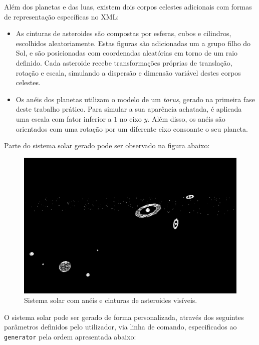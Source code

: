 \documentclass[12pt, a4paper]{article}
\begin{document}
Além dos planetas e das luas, existem dois corpos celestes adicionais com formas de representação
específicas no XML:

\begin{itemize}
    \item As cinturas de asteroides são compostas por esferas, cubos e cilindros, escolhidos
        aleatoriamente. Estas figuras são adicionadas um a grupo filho do Sol, e são posicionadas
        com coordenadas aleatórias em torno de um raio definido. Cada asteroide recebe
        transformações próprias de translação, rotação e escala, simulando a dispersão e dimensão
        variável destes corpos celestes.

    \item Os anéis dos planetas utilizam o modelo de um \emph{torus}, gerado na primeira fase deste
        trabalho prático. Para simular a sua aparência achatada, é aplicada uma escala com fator
        inferior a $1$ no eixo $y$. Além disso, os anéis são orientados com uma rotação por um
        diferente eixo consoante o seu planeta.
\end{itemize}

Parte do sistema solar gerado pode ser observado na figura abaixo:

\begin{figure}[H]
    \centering
    \includegraphics[width=0.9\linewidth]{res/phase2/results/SolarSystemOverview.png}
    \caption{Sistema solar com anéis e cinturas de asteroides visíveis.}
\end{figure}

O sistema solar pode ser gerado de forma personalizada, através dos seguintes parâmetros definidos
pelo utilizador, via linha de comando, especificados ao \texttt{generator} pela ordem apresentada
abaixo:
\end{document}

